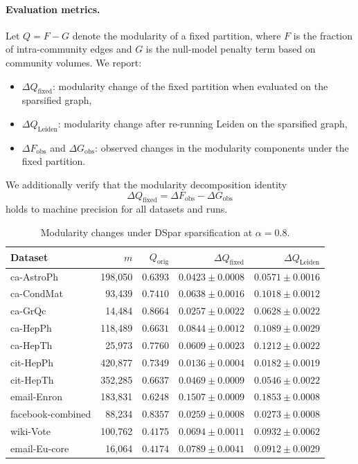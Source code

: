 \documentclass[10pt,journal,compsoc]{IEEEtran}
\begin{document}
\paragraph{Evaluation metrics.}
Let $Q = F - G$ denote the modularity of a fixed partition, where $F$ is the fraction of intra-community edges and $G$ is the null-model penalty term based on community volumes. We report:
\begin{itemize}
  \item $\Delta Q_{\mathrm{fixed}}$: modularity change of the fixed partition when evaluated on the sparsified graph,
  \item $\Delta Q_{\mathrm{Leiden}}$: modularity change after re-running Leiden on the sparsified graph,
  \item $\Delta F_{\mathrm{obs}}$ and $\Delta G_{\mathrm{obs}}$: observed changes in the modularity components under the fixed partition.
\end{itemize}

We additionally verify that the modularity decomposition identity
\[
\Delta Q_{\mathrm{fixed}} = \Delta F_{\mathrm{obs}} - \Delta G_{\mathrm{obs}}
\]
holds to machine precision for all datasets and runs.


\begin{table}[t]
\centering
\caption{Modularity changes under DSpar sparsification at $\alpha = 0.8$.}
\label{tab:exp1_2_modularity}
\begin{tabular}{lrrrr}
\toprule
Dataset & $m$ & $Q_{\mathrm{orig}}$ & $\Delta Q_{\mathrm{fixed}}$ & $\Delta Q_{\mathrm{Leiden}}$ \\
\midrule
ca-AstroPh\cite{leskovec2007graph} & 198,050 & $0.6393$ & $0.0423 \pm 0.0008$ & $0.0571 \pm 0.0016$ \\
ca-CondMat\cite{leskovec2007graph}& 93,439 & $0.7410$ & $0.0638 \pm 0.0016$ & $0.1018 \pm 0.0012$ \\
ca-GrQc\cite{leskovec2007graph} & 14,484 & $0.8664$ & $0.0257 \pm 0.0022$ & $0.0628 \pm 0.0022$ \\
ca-HepPh\cite{leskovec2007graph} & 118,489 & $0.6631$ & $0.0844 \pm 0.0012$ & $0.1089 \pm 0.0029$ \\
ca-HepTh\cite{leskovec2007graph} & 25,973 & $0.7760$ & $0.0609 \pm 0.0023$ & $0.1212 \pm 0.0022$ \\
cit-HepPh\cite{leskovec2007graph} & 420,877 & $0.7349$ & $0.0136 \pm 0.0004$ & $0.0182 \pm 0.0019$ \\
cit-HepTh\cite{leskovec2007graph} & 352,285 & $0.6637$ & $0.0469 \pm 0.0009$ & $0.0546 \pm 0.0022$ \\
email-Enron\cite{leskovec2009community} & 183,831 & $0.6248$ & $0.1507 \pm 0.0009$ & $0.1853 \pm 0.0008$ \\
facebook-combined\cite{leskovec2012learning} & 88,234 & $0.8357$ & $0.0259 \pm 0.0008$ & $0.0273 \pm 0.0008$ \\
wiki-Vote\cite{leskovec2010signed} & 100,762 & $0.4175$ & $0.0694 \pm 0.0011$ & $0.0932 \pm 0.0062$ \\
email-Eu-core\cite{yin2017local} & 16,064 & $0.4174$ & $0.0789 \pm 0.0041$ & $0.0912 \pm 0.0029$ \\
\bottomrule
\end{tabular}
\end{table}
\end{document}
